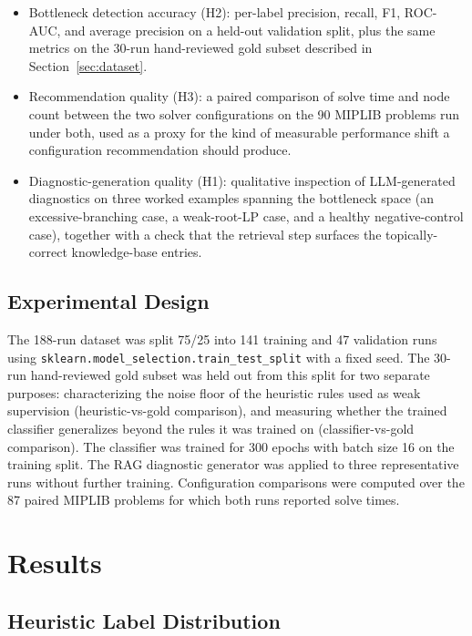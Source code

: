 \documentclass[11pt]{article}
\begin{document}
\begin{itemize}
    \item Bottleneck detection accuracy (H2): per-label precision, recall, F1, ROC-AUC, and average precision on a held-out validation split, plus the same metrics on the 30-run hand-reviewed gold subset described in Section~\ref{sec:dataset}.
    \item Recommendation quality (H3): a paired comparison of solve time and node count between the two solver configurations on the 90 MIPLIB problems run under both, used as a proxy for the kind of measurable performance shift a configuration recommendation should produce.
    \item Diagnostic-generation quality (H1): qualitative inspection of LLM-generated diagnostics on three worked examples spanning the bottleneck space (an excessive-branching case, a weak-root-LP case, and a healthy negative-control case), together with a check that the retrieval step surfaces the topically-correct knowledge-base entries.
\end{itemize}

\subsection{Experimental Design}

The 188-run dataset was split 75/25 into 141 training and 47 validation runs using \texttt{sklearn.model\_selection.train\_test\_split} with a fixed seed. The 30-run hand-reviewed gold subset was held out from this split for two separate purposes: characterizing the noise floor of the heuristic rules used as weak supervision (heuristic-vs-gold comparison), and measuring whether the trained classifier generalizes beyond the rules it was trained on (classifier-vs-gold comparison). The classifier was trained for 300 epochs with batch size 16 on the training split. The RAG diagnostic generator was applied to three representative runs without further training. Configuration comparisons were computed over the 87 paired MIPLIB problems for which both runs reported solve times.

\section{Results}
\label{sec:results}

\subsection{Heuristic Label Distribution}
\end{document}

